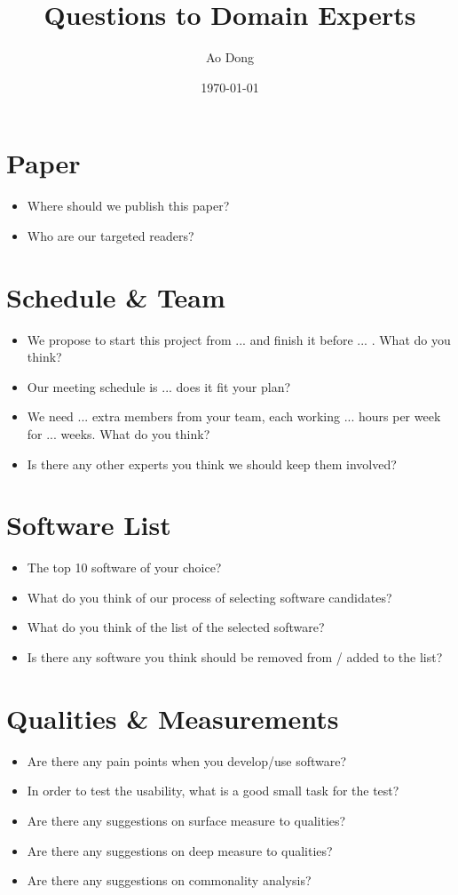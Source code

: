 \documentclass[12pt]{article}
\title{Questions to Domain Experts}
\author{Ao Dong}
\date{\today}
\begin{document}
\maketitle

\section{Paper}
\begin{itemize}
\item Where should we publish this paper?
\item Who are our targeted readers?
\end{itemize}

\section{Schedule \& Team}
\begin{itemize}
\item We propose to start this project from ... and finish it before ... . What
do you think?
\item Our meeting schedule is ... does it fit your plan?
\item We need ... extra members from your team, each working ... hours per week
for ... weeks. What do you think?
\item Is there any other experts you think we should keep them involved?
\end{itemize}

\section{Software List}
\begin{itemize}
\item The top 10 software of your choice?
\item What do you think of our process of selecting software candidates?
\item What do you think of the list of the selected software?
\item Is there any software you think should be removed from / added to the
list?
\end{itemize}

\section{Qualities \& Measurements}
\begin{itemize}
\item Are there any pain points when you develop/use software?
\item In order to test the usability, what is a good small task for the test?
\item Are there any suggestions on surface measure to qualities?
\item Are there any suggestions on deep measure to qualities?
\item Are there any suggestions on commonality analysis?
\end{itemize}
\end{document}
